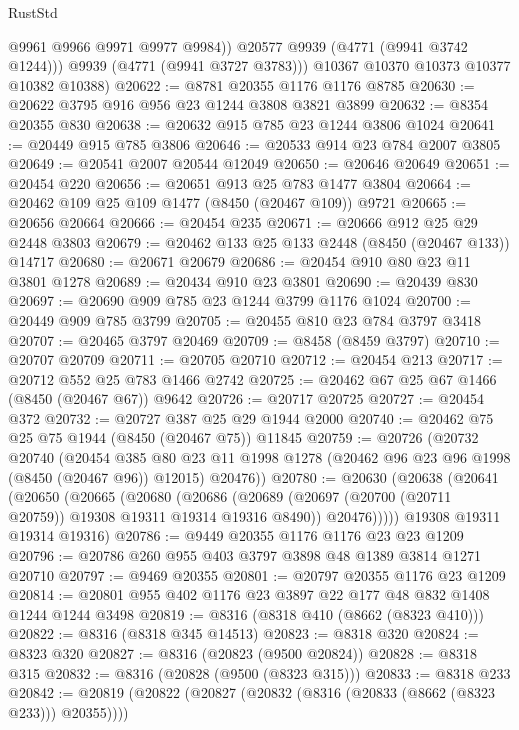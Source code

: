 \begin{lexlean}{RustStd}
\begin{coremodule}
              @9961
              @9966
              @9971
              @9977
              @9984))
          @20577
          @9939
          (@4771 (@9941 @3742 @1244)))
        @9939
        (@4771 (@9941 @3727 @3783)))
      @10367
      @10370
      @10373
      @10377
      @10382
      @10388)
@20622 := @8781 @20355 @1176 @1176 @8785
@20630 := @20622 @3795 @916 @956 @23 @1244 @3808 @3821 @3899
@20632 := @8354 @20355 @830
@20638 := @20632 @915 @785 @23 @1244 @3806 @1024
@20641 := @20449 @915 @785 @3806
@20646 := @20533 @914 @23 @784 @2007 @3805
@20649 := @20541 @2007 @20544 @12049
@20650 := @20646 @20649
@20651 := @20454 @220
@20656 := @20651 @913 @25 @783 @1477 @3804
@20664 := @20462 @109 @25 @109 @1477 (@8450 (@20467 @109)) @9721
@20665 := @20656 @20664
@20666 := @20454 @235
@20671 := @20666 @912 @25 @29 @2448 @3803
@20679 := @20462 @133 @25 @133 @2448 (@8450 (@20467 @133)) @14717
@20680 := @20671 @20679
@20686 := @20454 @910 @80 @23 @11 @3801 @1278
@20689 := @20434 @910 @23 @3801
@20690 := @20439 @830
@20697 := @20690 @909 @785 @23 @1244 @3799 @1176 @1024
@20700 := @20449 @909 @785 @3799
@20705 := @20455 @810 @23 @784 @3797 @3418
@20707 := @20465 @3797 @20469
@20709 := @8458 (@8459 @3797)
@20710 := @20707 @20709
@20711 := @20705 @20710
@20712 := @20454 @213
@20717 := @20712 @552 @25 @783 @1466 @2742
@20725 := @20462 @67 @25 @67 @1466 (@8450 (@20467 @67)) @9642
@20726 := @20717 @20725
@20727 := @20454 @372
@20732 := @20727 @387 @25 @29 @1944 @2000
@20740 := @20462 @75 @25 @75 @1944 (@8450 (@20467 @75)) @11845
@20759 := @20726
    (@20732
      @20740
      (@20454
        @385
        @80
        @23
        @11
        @1998
        @1278
        (@20462 @96 @23 @96 @1998 (@8450 (@20467 @96)) @12015)
        @20476))
@20780 := @20630
    (@20638
      (@20641
        (@20650
          (@20665
            (@20680
              (@20686
                (@20689 (@20697 (@20700 (@20711 @20759)) @19308 @19311 @19314 @19316 @8490))
                @20476)))))
      @19308
      @19311
      @19314
      @19316)
@20786 := @9449 @20355 @1176 @1176 @23 @23 @1209
@20796 := @20786 @260 @955 @403 @3797 @3898 @48 @1389 @3814 @1271 @20710
@20797 := @9469 @20355
@20801 := @20797 @20355 @1176 @23 @1209
@20814 := @20801 @955 @402 @1176 @23 @3897 @22 @177 @48 @832 @1408 @1244 @1244 @3498
@20819 := @8316 (@8318 @410 (@8662 (@8323 @410)))
@20822 := @8316 (@8318 @345 @14513)
@20823 := @8318 @320
@20824 := @8323 @320
@20827 := @8316 (@20823 (@9500 @20824))
@20828 := @8318 @315
@20832 := @8316 (@20828 (@9500 (@8323 @315)))
@20833 := @8318 @233
@20842 := @20819 (@20822 (@20827 (@20832 (@8316 (@20833 (@8662 (@8323 @233))) @20355))))

\end{coremodule}
\end{lexlean}
